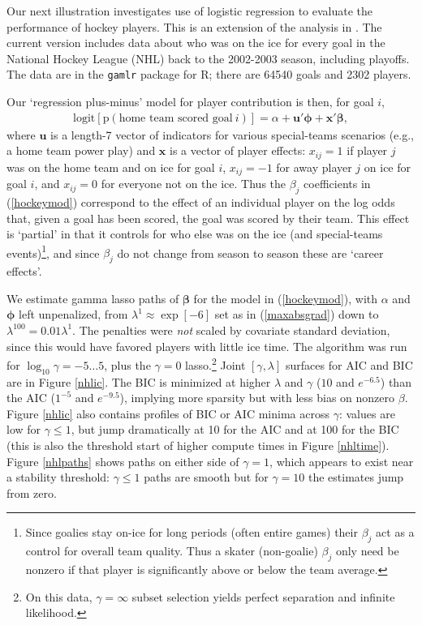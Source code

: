 \documentclass[12pt]{article}
\newcommand{\bs}[1]{\boldsymbol{#1}}
\newcommand{\mr}[1]{\mathrm{#1}}
\newcommand{\bm}[1]{\mathbf{#1}}
\begin{document}
Our next illustration investigates use of logistic regression to evaluate the
performance of hockey players.  This is an extension of the analysis in
\cite{gramacy_estimating_2013}.  The current version includes data about who
was on the ice for every goal in the National Hockey League (NHL) back to the
2002-2003 season, including playoffs.  The data
are in the {\tt gamlr} package for {\sf R}; there are
64540 goals and 2302 players.


Our `regression plus-minus' model for
player contribution is then, for goal $i$, 
\begin{align}\label{hockeymod}
\mr{logit}\left[\mr{p}(\text{home~team~scored~goal}~i)\right] = \alpha +
\bm{u}'\bs{\phi} + \bm{x}'\bs{\beta}, 
\end{align} 
where $\bm{u}$ is a length-7
vector of indicators for various special-teams scenarios (e.g., a home team
power play) and $\bm{x}$ is a vector of player effects: $x_{ij}=1$ if player
$j$ was on the home team and on ice for goal $i$, $x_{ij}=-1$ for away player
$j$ on ice for goal $i$, and $x_{ij}=0$ for everyone not on the ice.  
Thus the $\beta_j$ coefficients in (\ref{hockeymod}) correspond to the 
effect of an individual player on the log odds that, given a goal has been
scored, the goal was scored by their team.  This effect is `partial' in that
it controls for who else was on the ice (and special-teams
events)\footnote{Since goalies stay
on-ice for long periods (often entire games) their $\beta_j$  act as a
control for overall team quality.  Thus a skater (non-goalie) $\beta_j$ only need be
nonzero if that player is significantly above or below the team average.}, 
and since $\beta_j$ do not change from season
to season these are `career effects'.

We estimate gamma lasso paths of $\bs{\beta}$ for the model in
(\ref{hockeymod}), with  $\alpha$ and $\bs{\phi}$ left unpenalized, from  
$\lambda^1\approx \exp[-6]$ set as in (\ref{maxabsgrad}) down to $\lambda^{100} =
0.01\lambda^1$.  The penalties were {\it not} scaled by covariate standard
deviation, since this would have favored players with little ice time.  The
algorithm was run for $\log_{10}\gamma = -5 \ldots 5$, plus the $\gamma=0$
lasso.\footnote{On this data, $\gamma=\infty$ subset selection yields perfect separation and infinite likelihood.}
Joint $[\gamma,\lambda]$ surfaces
for AIC and BIC are in Figure \ref{nhlic}.  The BIC is minimized at higher $\lambda$
and $\gamma$ ($10$ and $e^{-6.5}$) than the AIC ($1^{-5}$ and $e^{-9.5}$), implying more sparsity but with less bias on
nonzero $\beta$.  Figure \ref{nhlic} also contains profiles
of BIC or AIC minima across $\gamma$: values are low for $\gamma \leq 1$,
but jump dramatically at 10 for the AIC and at 100 for the BIC (this is also the threshold start of higher compute times in Figure \ref{nhltime}).  
Figure \ref{nhlpaths}
shows paths on either side of $\gamma=1$, which appears to exist near a stability threshold: $\gamma\leq 1$ paths are smooth but for $\gamma=10$ the estimates jump from zero.
\end{document}
